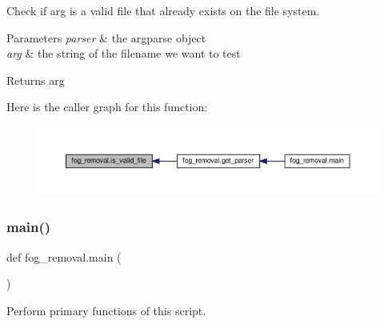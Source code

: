 Check if arg is a valid file that already exists on the file system. 


\begin{DoxyParams}{Parameters}
{\em parser} & the argparse object \\
\hline
{\em arg} & the string of the filename we want to test\\
\hline
\end{DoxyParams}
\begin{DoxyReturn}{Returns}
arg 
\end{DoxyReturn}
Here is the caller graph for this function\+:
\nopagebreak
\begin{figure}[H]
\begin{center}
\leavevmode
\includegraphics[width=350pt]{namespacefog__removal_a7b07384f6a6ff8498e14f3aa5f8e2252_icgraph}
\end{center}
\end{figure}
\mbox{\label{namespacefog__removal_a427a577da8405e5624962d7ef722aadf}} 
\subsubsection{\texorpdfstring{main()}{main()}}
{\footnotesize\ttfamily def fog\+\_\+removal.\+main (\begin{DoxyParamCaption}{ }\end{DoxyParamCaption})}



Perform primary functions of this script. 

